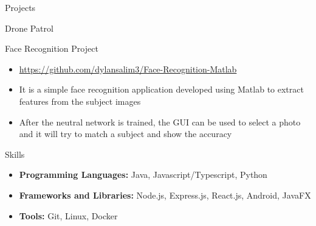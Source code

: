 \documentclass[]{mcdowellcv}
\begin{document}
\begin{cvsection}{Projects}
\begin{cvsubsection}{Drone Patrol}{}{}
\begin{itemize}
		\end{itemize}
	\end{cvsubsection}
	\begin{cvsubsection}{Face Recognition Project}{}{}
		\begin{itemize}
			\item \url{https://github.com/dylansalim3/Face-Recognition-Matlab}
			\item It is a simple face recognition application developed using Matlab to extract features from the subject images
			\item After the neutral network is trained, the GUI can be used to select a photo and it will try to match a subject and show the accuracy
		\end{itemize}
	\end{cvsubsection}
\end{cvsection}
\begin{cvsection}{Skills}
	\begin{cvsubsection}{}{}{}
		\begin{itemize}
			\item \textbf{Programming Languages:}  Java, Javascript/Typescript, Python
			\item \textbf{Frameworks and Libraries:}  Node.js, Express.js, React.js, Android, JavaFX
			\item \textbf{Tools:}  Git, Linux, Docker
		\end{itemize}
	\end{cvsubsection}
\end{cvsection}
\end{document}
